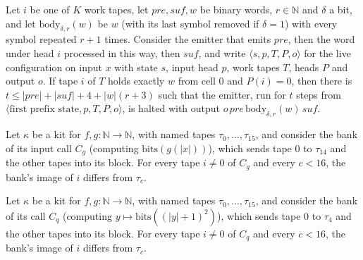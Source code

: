 \begin{theorem}
\label{Turing.NTimeDiag.qy_emit_stop}
\leanok
{}
Let $i$ be one of $K$ work tapes, let $\mathit{pre}, \mathit{suf}, w$ be binary words, $r \in
\mathbb{N}$ and $\delta$ a bit, and let $\mathrm{body}_{\delta,r}(w)$ be $w$ (with its last symbol
removed if $\delta = 1$) with every symbol repeated $r + 1$ times. Consider the emitter that emits
$\mathit{pre}$, then the word under head $i$ processed in this way, then $\mathit{suf}$, and write
$\langle s, p, T, P, o\rangle$ for the live configuration on input $x$ with state $s$, input head
$p$, work tapes $T$, heads $P$ and output $o$. If tape $i$ of $T$ holds exactly $w$ from cell $0$
and $P(i) = 0$, then there is $t \le |\mathit{pre}| + |\mathit{suf}| + 4 + |w|(r + 3)$ such that
the emitter, run for $t$ steps from $\langle \text{first prefix state}, p, T, P, o\rangle$, is
halted with output $o\,\mathit{pre}\,\mathrm{body}_{\delta,r}(w)\,\mathit{suf}$.
\end{theorem}

\begin{theorem}
\label{Turing.NTimeDiag.QyKit.bCg_ne}
\leanok
{}
Let $\kappa$ be a kit for $f, g : \mathbb{N} \to \mathbb{N}$, with named tapes $\tau_0, \dots,
\tau_{15}$, and consider the bank of its input call $C_g$ (computing $\mathrm{bits}(g(|x|))$),
which sends tape $0$ to $\tau_{14}$ and the other tapes into its block. For every tape $i \ne 0$ of
$C_g$ and every $c < 16$, the bank's image of $i$ differs from $\tau_c$.
\end{theorem}

\begin{theorem}
\label{Turing.NTimeDiag.QyKit.bPb_ne}
\leanok
{}
Let $\kappa$ be a kit for $f, g : \mathbb{N} \to \mathbb{N}$, with named tapes $\tau_0, \dots,
\tau_{15}$, and consider the bank of its call $C_q$ (computing $y \mapsto \mathrm{bits}((|y| +
1)^2)$), which sends tape $0$ to $\tau_4$ and the other tapes into its block. For every tape $i \ne
0$ of $C_q$ and every $c < 16$, the bank's image of $i$ differs from $\tau_c$.
\end{theorem}

